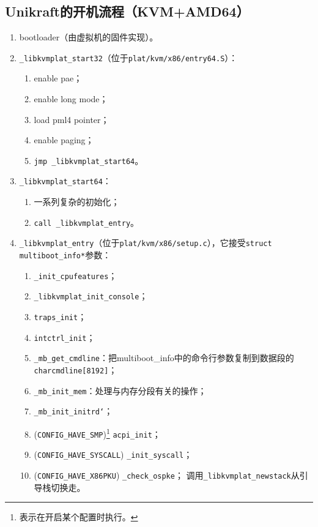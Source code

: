 \documentclass[UTF8,fontset=none,linespread=1.15]{ctexart}
\begin{document}
\subsection{Unikraft的开机流程（KVM+AMD64）}
\begin{enumerate}
\item bootloader（由虚拟机的固件实现）。
\item \texttt{\_libkvmplat\_start32}（位于\texttt{plat/kvm/x86/entry64.S}）：
    \begin{enumerate}
    \item enable pae；
    \item enable long mode；
    \item load pml4 pointer；
    \item enable paging；
    \item \texttt{jmp \_libkvmplat\_start64}。
    \end{enumerate}
\item \texttt{\_libkvmplat\_start64}：
    \begin{enumerate}
    \item 一系列复杂的初始化；
    \item \texttt{call \_libkvmplat\_entry}。
    \end{enumerate}
\item \texttt{\_libkvmplat\_entry}（位于\texttt{plat/kvm/x86/setup.c}），它接受\texttt{struct multiboot\_info*}参数：
    \begin{enumerate}
    \item \texttt{\_init\_cpufeatures}；
    \item \texttt{\_libkvmplat\_init\_console}；
    \item \texttt{traps\_init}；
    \item \texttt{intctrl\_init}；
    \item \texttt{\_mb\_get\_cmdline}：把multiboot\_info中的命令行参数复制到数据段的\texttt{char\linebreak cmdline[8192]}；
    \item \texttt{\_mb\_init\_mem}：处理与内存分段有关的操作；
    \item \texttt{\_mb\_init\_initrd`}；
    \item (\texttt{CONFIG\_HAVE\_SMP})\footnote{表示在开启某个配置时执行。} \texttt{acpi\_init}；
    \item (\texttt{CONFIG\_HAVE\_SYSCALL}) \texttt{\_init\_syscall}；
    \item (\texttt{CONFIG\_HAVE\_X86PKU}) \texttt{\_check\_ospke}；
    调用\texttt{\_libkvmplat\_newstack}从引导栈切换走。

\end{enumerate}
\end{enumerate}
\end{document}
